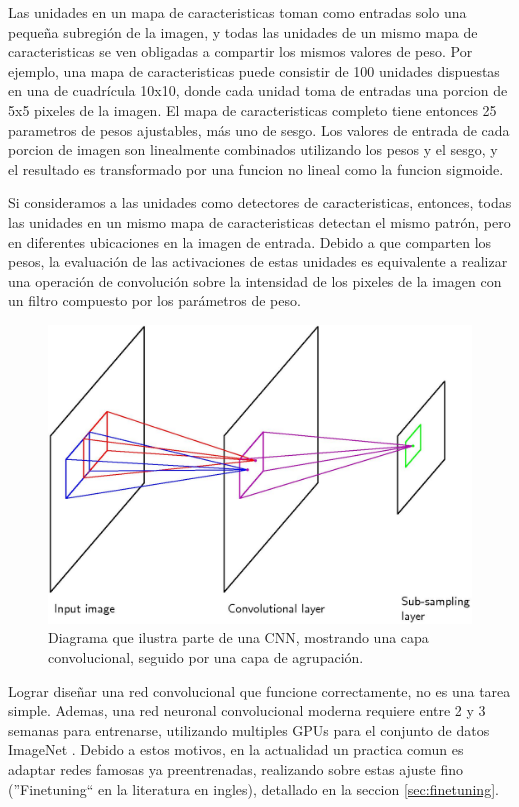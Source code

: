 \documentclass[a4paper,11pt,spanish]{book}
\begin{document}
      Las unidades en un mapa de caracteristicas toman como entradas solo una pequeña subregión de la imagen, y todas las unidades de un mismo mapa de caracteristicas se
      ven obligadas a compartir los mismos valores de peso. Por ejemplo, una mapa de caracteristicas puede consistir de 100 unidades dispuestas en una de cuadrícula 10x10,
      donde cada unidad  toma de entradas una porcion de 5x5 pixeles de la imagen. El mapa de caracteristicas completo tiene entonces 25 parametros de pesos ajustables,
      más uno de sesgo. Los valores de entrada de cada porcion de imagen son linealmente combinados utilizando los pesos y el sesgo, y el resultado es transformado por una funcion 
      no lineal como la funcion sigmoide.

      Si consideramos a las unidades como detectores de caracteristicas, entonces, todas las unidades en un mismo mapa de caracteristicas detectan el mismo patrón, pero en diferentes
      ubicaciones en la imagen de entrada. Debido a que comparten los pesos, la evaluación de las activaciones de estas unidades es equivalente a  realizar una operación de convolución
      sobre la intensidad de los pixeles de la imagen con un filtro compuesto por los parámetros de peso.
      
      \begin{figure}[h]
	\begin{center}
	\includegraphics[width=0.8\linewidth]{./img/bishop_cnn.jpg}
	\end{center}
	\caption{Diagrama que ilustra parte de una CNN, mostrando una capa convolucional, seguido por una capa de agrupación.}
	\label{fig:bishop_cnn}
      \end{figure}
      
      Lograr diseñar una red convolucional que funcione correctamente, no es una tarea simple. Ademas, una red neuronal convolucional moderna requiere entre 2 y 3 semanas para entrenarse, 
      utilizando multiples GPUs para el conjunto de datos ImageNet \cite{imagenet_cvpr09}. Debido a estos motivos, en la actualidad un practica comun es adaptar
      redes famosas ya preentrenadas, realizando sobre estas ajuste fino (''Finetuning`` en la literatura en ingles), detallado en la seccion \ref{sec:finetuning}.
\end{document}
